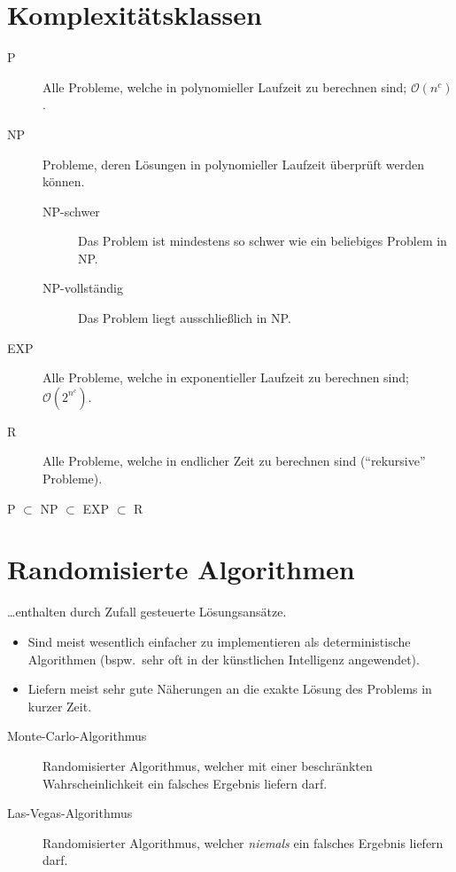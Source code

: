 \section{Komplexitätsklassen}

\begin{description}
  \item [{P}] Alle Probleme, welche in polynomieller Laufzeit zu berechnen sind; $\mathcal{O}(n^c)$.
  \item [{NP}] Probleme, deren Lösungen in polynomieller Laufzeit überprüft werden können.
	\begin{description}
	  \item [{NP-schwer}] Das Problem ist mindestens so schwer wie ein beliebiges Problem in NP\@.
	  \item [{NP-vollständig}] Das Problem liegt ausschließlich in NP\@.
	\end{description}
  \item [{EXP}] Alle Probleme, welche in exponentieller Laufzeit zu berechnen sind; $\mathcal{O}(2^{n^c})$.
  \item [{R}] Alle Probleme, welche in endlicher Zeit zu berechnen sind (\enquote{rekursive} Probleme).
\end{description}

\noindent\begin{center}
  P $\subset$ NP $\subset$ EXP $\subset$ R
\end{center}


\section{Randomisierte Algorithmen}


\ldots{}enthalten durch Zufall gesteuerte Lösungsansätze.
\begin{itemize}
  \item Sind meist wesentlich einfacher zu implementieren als deterministische Algorithmen (bspw.~sehr oft in der künstlichen Intelligenz angewendet).
  \item Liefern meist sehr gute Näherungen an die exakte Lösung des Problems in kurzer Zeit.
\end{itemize}

\begin{description}
  \item [{Monte-Carlo-Algorithmus}] 
	Randomisierter Algorithmus, welcher mit einer beschränkten Wahrscheinlichkeit ein falsches Ergebnis liefern darf.
  \item [{Las-Vegas-Algorithmus}] 
	Randomisierter Algorithmus, welcher \emph{niemals} ein falsches Ergebnis liefern darf.
\end{description}


